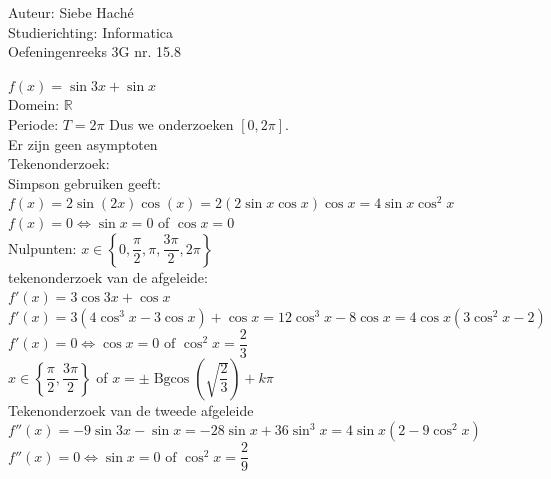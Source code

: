 \documentclass[a4paper]{article}
\begin{document}
\noindent \large Auteur: Siebe Haché \\
\noindent \large Studierichting: Informatica \\
\noindent \large Oefeningenreeks 3G nr. 15.8 \\

\medskip
\normalsize

$f(x) = \sin 3x + \sin x$\\

Domein: $\mathbb{R}$\\
 
Periode: $T = 2\pi$ Dus we onderzoeken $[0, 2\pi]$.\\

Er zijn geen asymptoten\\

Tekenonderzoek:\\

Simpson gebruiken geeft: \\

$f(x) = 2\sin(2x)\cos(x) = 2(2\sin x \cos x)\cos x = 4\sin x \cos^2 x$\\

$f(x) = 0 \Leftrightarrow \sin x = 0$ of $\cos x = 0$\\

Nulpunten: $x \in \left\{0, \dfrac{\pi}{2}, \pi, \dfrac{3\pi}{2}, 2\pi\right\}$\\


tekenonderzoek van de afgeleide:\\

$f'(x) = 3\cos 3x + \cos x$\\

$f'(x) = 3(4\cos^3 x - 3\cos x) + \cos x = 12\cos^3 x - 8\cos x = 4\cos x(3\cos^2 x - 2)$\\

$f'(x) = 0 \Leftrightarrow \cos x = 0 \text{ of } \cos^2 x = \dfrac{2}{3}$\\

$x \in \left\{\dfrac{\pi}{2}, \dfrac{3\pi}{2}\right\}$ of $x = \pm \operatorname{Bgcos}\left(\sqrt{\dfrac{2}{3}}\right) + k\pi$\\

Tekenonderzoek van de tweede afgeleide\\

$f''(x) = -9\sin 3x - \sin x = -28\sin x + 36\sin^3 x = 4\sin x(2 - 9\cos^2 x)$\\

$f''(x) = 0 \Leftrightarrow \sin x = 0 \text{ of } \cos^2 x = \dfrac{2}{9}$\\
\end{document}
